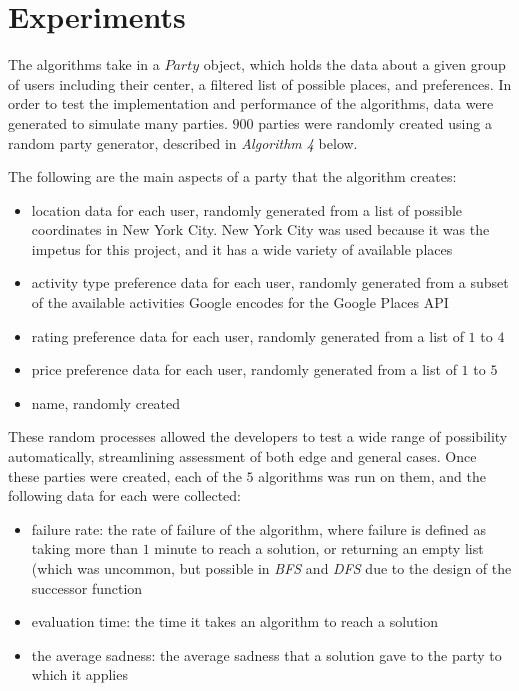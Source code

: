 \documentclass[11pt]{article}
\begin{document}
\newpage

\section{Experiments}

The algorithms take in a $Party$ object, which holds the data about a given group of users including their center, a filtered list of possible places, and preferences. In order to test the implementation and performance of the algorithms, data were generated to simulate many parties. $900$ parties were randomly created using a random party generator, described in \textit{Algorithm 4} below.

The following are the main aspects of a party that the algorithm creates:
\begin{itemize}
    \item location data for each user, randomly generated from a list of possible coordinates in New York City. New York City was used because it  was the impetus for this project, and it has a wide variety of available places
    \item activity type preference data for each user, randomly generated from a subset of the available activities Google encodes for the Google Places API
    \item rating preference data for each user, randomly generated from a list of $1$ to $4$
    \item price preference data for each user, randomly generated from a list of $1$ to $5$
    \item name, randomly created
\end{itemize}

These random processes allowed the developers to test a wide range of possibility automatically, streamlining assessment of both edge and general cases. Once these parties were created, each of the $5$ algorithms was run on them, and the following data for each were collected:
\begin{itemize}
    \item failure rate: the rate of failure of the algorithm, where failure is defined as taking more than $1$ minute to reach a solution, or returning an empty list (which was uncommon, but possible in \textit{BFS} and \textit{DFS} due to the design of the successor function
    \item evaluation time: the time it takes an algorithm to reach a solution
    \item the average sadness: the average sadness that a solution gave to the party to which it applies
\end{itemize}
\end{document}

